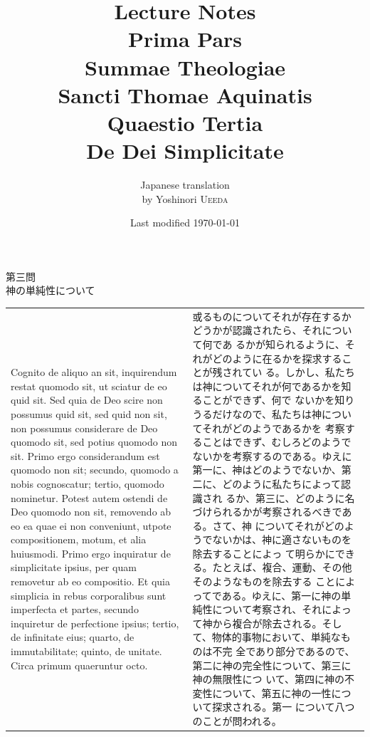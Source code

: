 \documentclass[paper=a4paper,fontsize=10pt,jafontsize=9pt,titlepage]{jlreq}
\title{Lecture Notes\\{\bfseries Prima Pars}\\{\Huge Summae Theologiae}\\Sancti Thomae
Aquinatis\\Quaestio Tertia\\{\bfseries De Dei Simplicitate}}
\author{Japanese translation\\by Yoshinori {\scshape Ueeda}}
\date{Last modified \today}
\begin{document}
\maketitle

\begin{center}
 {\Large 第三問\\神の単純性について}
\end{center}


\begin{longtable}{p{21em}p{21em}}

Cognito de aliquo an sit, inquirendum restat quomodo sit, ut sciatur de
eo quid sit. Sed quia de Deo scire non possumus quid sit, sed quid non
sit, non possumus considerare de Deo quomodo sit, sed potius quomodo non
sit. Primo ergo considerandum est quomodo non sit; secundo, quomodo a
nobis cognoscatur; tertio, quomodo nominetur. Potest autem ostendi de
Deo quomodo non sit, removendo ab eo ea quae ei non conveniunt, utpote
compositionem, motum, et alia huiusmodi. Primo ergo inquiratur de
simplicitate ipsius, per quam removetur ab eo compositio. Et quia
simplicia in rebus corporalibus sunt imperfecta et partes, secundo
inquiretur de perfectione ipsius; tertio, de infinitate eius; quarto, de
immutabilitate; quinto, de unitate. Circa primum quaeruntur octo. 


&
或るものについてそれが存在するかどうかが認識されたら、それについて何であ
 るかが知られるように、それがどのように在るかを探求することが残されてい
 る。しかし、私たちは神についてそれが何であるかを知ることができず、何で
 ないかを知りうるだけなので、私たちは神についてそれがどのようであるかを
 考察することはできず、むしろどのようでないかを考察するのである。ゆえに
 第一に、神はどのようでないか、第二に、どのように私たちによって認識され
 るか、第三に、どのように名づけられるかが考察されるべきである。さて、神
 についてそれがどのようでないかは、神に適さないものを除去することによっ
 て明らかにできる。たとえば、複合、運動、その他そのようなものを除去する
 ことによってである。ゆえに、第一に神の単純性について考察され、それによっ
 て神から複合が除去される。そして、物体的事物において、単純なものは不完
 全であり部分であるので、第二に神の完全性について、第三に神の無限性につ
 いて、第四に神の不変性について、第五に神の一性について探求される。第一
 について八つのことが問われる。

\\


\end{longtable}
\end{document}
